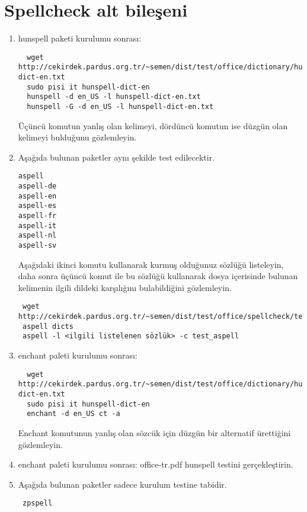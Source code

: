 \documentclass[a4paper,10pt]{article}
\begin{document}
\section{ Spellcheck alt bileşeni}
\begin{enumerate}
\item hunspell paketi kurulumu sonrası:

\begin{verbatim}
  wget http://cekirdek.pardus.org.tr/~semen/dist/test/office/dictionary/hunspell-dict-en.txt
  sudo pisi it hunspell-dict-en
  hunspell -d en_US -l hunspell-dict-en.txt
  hunspell -G -d en_US -l hunspell-dict-en.txt
\end{verbatim}
Üçüncü komutun yanlış olan kelimeyi, dördüncü komutun ise düzgün olan kelimeyi bulduğunu gözlemleyin.

\item Aşağıda bulunan paketler aynı şekilde test edilecektir.
\begin{verbatim}
aspell
aspell-de
aspell-en
aspell-es
aspell-fr
aspell-it
aspell-nl
aspell-sv 
\end{verbatim}

Aşağıdaki ikinci komutu kullanarak kurmuş olduğunuz sözlüğü listeleyin, daha sonra üçüncü komut ile bu sözlüğü kullanarak dosya içerisinde bulunan kelimenin ilgili dildeki karşılığını bulabildiğini gözlemleyin.
\begin{verbatim}
 wget http://cekirdek.pardus.org.tr/~semen/dist/test/office/spellcheck/test_aspell
 aspell dicts
 aspell -l <ilgili listelenen sözlük> -c test_aspell
\end{verbatim}
\item enchant paleti kurulumu sonrası:
\begin{verbatim}
  wget http://cekirdek.pardus.org.tr/~semen/dist/test/office/dictionary/hunspell-dict-en.txt
  sudo pisi it hunspell-dict-en
  enchant -d en_US ct -a
\end{verbatim}
Enchant komutunun yanlış olan sözcük için düzgün bir alternatif ürettiğini gözlemleyin.

\item enchant paleti kurulumu sonrası:
office-tr.pdf hunspell testini gerçekleştirin.
\item Aşağıda bulunan paketler sadece kurulum testine tabidir.
\begin{verbatim}
 zpspell
\end{verbatim}

\end{enumerate}
\end{document}
